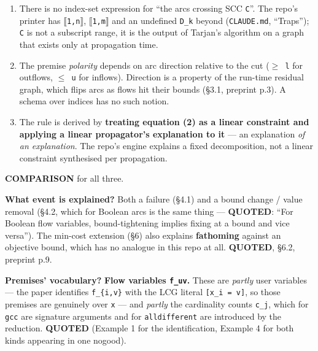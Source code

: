 \documentclass[10pt,a4paper]{article}
\newcommand{\provtag}[2]{{\small\sffamily\bfseries\textcolor{#1}{#2}}}
\newenvironment{pubblock}{%
  \par\smallskip
  \def\FrameCommand{\textcolor{litbar}{\vrule width 2.5pt}\hspace{9pt}}%
  \MakeFramed{\advance\hsize-\width\FrameRestore}}%
  {\endMakeFramed\par\smallskip}
\newcommand{\litsub}[1]{\par\smallskip{\sffamily\bfseries\textcolor{litbar}{#1}\par}}
\begin{document}
\begin{pubblock}
\begin{enumerate}\setlength{\itemsep}{0pt}
\item There is no index-set expression for ``the arcs crossing SCC \texttt{C}''. The repo's printer has \texttt{$\llbracket$1,n$\rrbracket$}, \texttt{$\llbracket$1,m$\rrbracket$} and an undefined \texttt{D\_k} beyond (\texttt{CLAUDE.md}, ``Traps''); \texttt{C} is not a subscript range, it is the output of Tarjan's algorithm on a graph that exists only at propagation time.
\item The premise \emph{polarity} depends on arc direction relative to the cut (\texttt{$\geq$ l} for outflows, \texttt{$\leq$ u} for inflows). Direction is a property of the run-time residual graph, which flips arcs as flows hit their bounds (\S{}3.1, preprint p.3). A schema over indices has no such notion.
\item The rule is derived by \textbf{treating equation (2) as a linear constraint and applying a linear propagator's explanation to it} --- an explanation \emph{of an explanation}. The repo's engine explains a fixed decomposition, not a linear constraint synthesised per propagation.
\end{enumerate}
\provtag{tagcomparison}{COMPARISON} for all three.

\par\smallskip
\litsub{Answers to the four catalog questions}
\textbf{What event is explained?} Both a failure (\S{}4.1) and a bound change / value removal (\S{}4.2, which for Boolean arcs is the same thing --- \provtag{tagquoted}{QUOTED}: ``For Boolean flow variables, bound-tightening implies fixing at a bound and vice versa''). The min-cost extension (\S{}6) also explains \textbf{fathoming} against an objective bound, which has no analogue in this repo at all. \provtag{tagquoted}{QUOTED}, \S{}6.2, preprint p.9.

\textbf{Premises' vocabulary?} \textbf{Flow variables \texttt{f\_uv}.} These are \emph{partly} user variables --- the paper identifies \texttt{f\_\{i,v\}} with the LCG literal \texttt{[x\_i = v]}, so those premises are genuinely over \texttt{x} --- and \emph{partly} the cardinality counts \texttt{c\_j}, which for \texttt{gcc} are signature arguments and for \texttt{alldifferent} are introduced by the reduction. \provtag{tagquoted}{QUOTED} (Example 1 for the identification, Example 4 for both kinds appearing in one nogood).


\end{pubblock}
\end{document}
